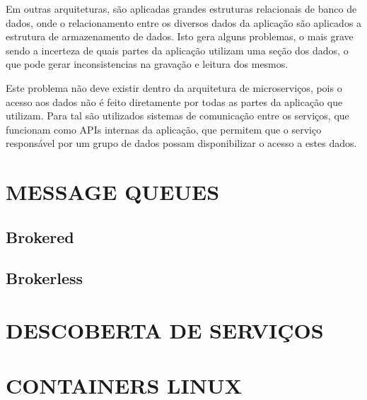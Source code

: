 Em outras arquiteturas, são aplicadas grandes estruturas relacionais de banco
de dados, onde o relacionamento entre os diversos dados da aplicação são
aplicados a estrutura de armazenamento de dados. Isto gera alguns problemas,
o mais grave sendo a incerteza de quais partes da aplicação utilizam uma
seção dos dados, o que pode gerar inconsistencias na gravação e leitura dos
mesmos.

Este problema não deve existir dentro da arquitetura de microserviços, pois o
acesso aos dados não é feito diretamente por todas as partes da aplicação que
utilizam. Para tal são utilizados sistemas de comunicação entre os serviços,
que funcionam como \ac{APIs} internas da aplicação, que permitem que o serviço
responsável por um grupo de dados possam disponibilizar o acesso a estes dados.

\section{MESSAGE QUEUES}

\subsection{Brokered}

\subsection{Brokerless}

\section{DESCOBERTA DE SERVIÇOS}

\section{CONTAINERS LINUX}
